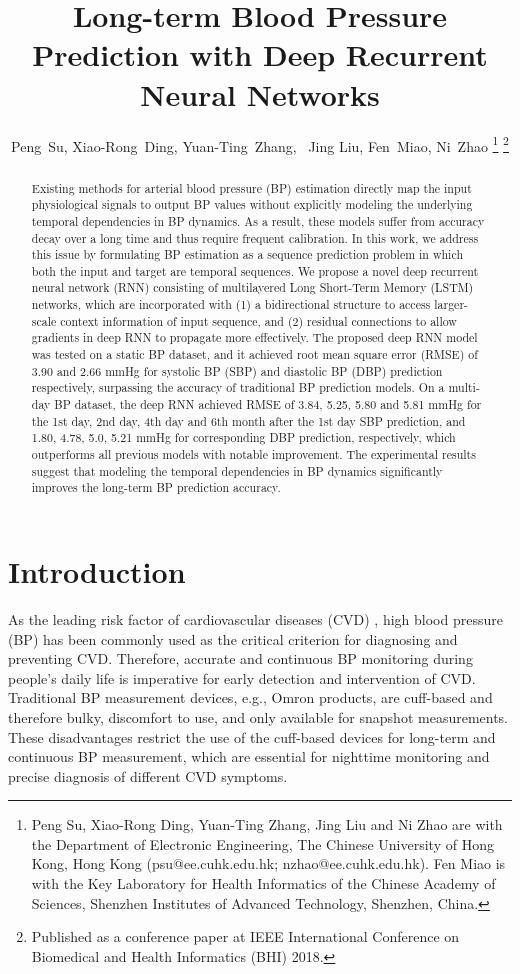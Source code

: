 \documentclass[letterpaper, 10 pt, conference]{ieeeconf}
\title{\LARGE \bf
Long-term Blood Pressure Prediction with Deep Recurrent Neural Networks
}
\author{Peng~Su, Xiao-Rong~Ding, Yuan-Ting~Zhang,~\IEEEmembership{Fellow,~IEEE,} Jing Liu, Fen~Miao, Ni~Zhao  
    \thanks{Peng Su, Xiao-Rong Ding, Yuan-Ting Zhang, Jing Liu and Ni Zhao are with the Department of Electronic Engineering, The Chinese University of Hong Kong, Hong Kong (psu@ee.cuhk.edu.hk;  nzhao@ee.cuhk.edu.hk). Fen Miao is with the Key Laboratory for Health Informatics of the Chinese Academy of Sciences, Shenzhen Institutes of Advanced Technology, Shenzhen, China.}
    \thanks{Published as a conference paper at IEEE International Conference on Biomedical and Health Informatics (BHI) 2018.}
}
\begin{document}
\maketitle
\thispagestyle{empty}
\pagestyle{empty}



\begin{abstract}
Existing methods for arterial blood pressure (BP) estimation directly map the input physiological signals to output BP values without explicitly modeling the underlying temporal dependencies in BP dynamics. 
As a result, these models suffer from accuracy decay over a long time and thus require frequent calibration. 
In this work, we address this issue by formulating BP estimation as a sequence prediction problem in which both the input and target are temporal sequences. 
We propose a novel deep recurrent neural network (RNN) consisting of multilayered Long Short-Term Memory (LSTM) networks, which are incorporated with (1) a bidirectional structure to access larger-scale context information of input sequence, and (2) residual connections to allow gradients in deep RNN to propagate more effectively.
The proposed deep RNN model was tested on a static BP dataset, and it achieved root mean square error (RMSE) of 3.90 and 2.66 mmHg for systolic BP (SBP) and diastolic BP (DBP) prediction respectively, surpassing the accuracy of traditional BP prediction models.
On a multi-day BP dataset, the deep RNN achieved RMSE of 3.84, 5.25, 5.80 and 5.81 mmHg for the 1st day, 2nd day, 4th day and 6th month after the 1st day SBP prediction, and 1.80, 4.78, 5.0, 5.21 mmHg for corresponding DBP prediction, respectively, which outperforms all previous models with notable improvement.
The experimental results suggest that modeling the temporal dependencies in BP dynamics significantly improves the long-term BP prediction accuracy.
\end{abstract}


\IEEEpeerreviewmaketitle


\section{Introduction}
As the leading risk factor of cardiovascular diseases (CVD) \cite{lim2013comparative}, high blood pressure (BP) has been commonly used as the critical criterion for diagnosing and preventing CVD. 
Therefore, accurate and continuous BP monitoring during people's daily life is  imperative for early detection and intervention of CVD.
Traditional BP measurement devices, e.g., Omron products, are cuff-based and therefore bulky, discomfort to use, and only available for snapshot measurements. These disadvantages restrict the use of the cuff-based devices for 
long-term and continuous BP measurement, which are essential for nighttime monitoring and precise diagnosis of different CVD symptoms. 
\end{document}
